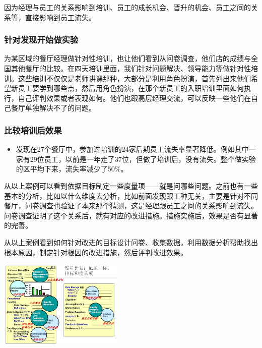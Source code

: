 因为经理与员工的关系影响到培训、员工的成长机会、晋升的机会、员工之间的关系等，直接影响到员工流失。

\hypertarget{ux9488ux5bf9ux53d1ux73b0ux5f00ux59cbux505aux5b9eux9a8c}{%
\subsubsection{针对发现开始做实验}\label{ux9488ux5bf9ux53d1ux73b0ux5f00ux59cbux505aux5b9eux9a8c}}

为某区域的餐厅经理做针对性培训，也让他们看到从问卷调查，他们店的成绩与全国其他餐厅的比较。在四天培训里面，我们针对问题解决、领导能力等做针对性培训。这些培训不仅仅是老师讲课那种，大部分是利用角色扮演，首先列出来他们希望新员工要学到哪些点，然后用角色扮演，在那个新员工的入职培训里面如何执行，自己评判效果或者表现如何。他们也跟高层经理交流，可以反映一些他们在自己餐厅单独解决不了的问题。

\hypertarget{ux6bd4ux8f83ux57f9ux8badux540eux6548ux679c}{%
\subsubsection{比较培训后效果}\label{ux6bd4ux8f83ux57f9ux8badux540eux6548ux679c}}

\begin{itemize}
\tightlist
\item
  发现在27个餐厅中，参加过培训的24家后期员工流失率显著降低。例如其中一家有29位员工，以前是一年走了37位，但做了培训后，没有流失。整个做实验的区平均下来，流失率减少了50\%。\\
\end{itemize}

从以上案例可以看到依据目标制定一些度量项------就是问哪些问题。之前也有一些基本的分析，比如以什么维度去分析，比如前面发现跟工种无关，主要是针对不同餐厅，问卷调查也验证了本来那个猜测，这是经理跟员工之间的关系影响到流失。问卷调查证明了这个关系后，就有对应的改进措施。措施实施后，效果是否有显著的完善。

从以上案例看到如何针对改进的目标设计问卷、收集数据，利用数据分析帮助找出根本原因，制定针对根因的改进措施，然后评判改进效果。


\includegraphics[width=6cm]{tys51_101.jpg}

